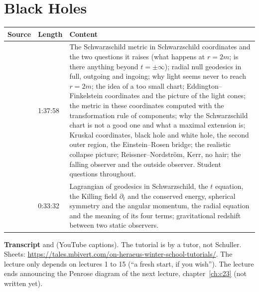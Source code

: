 \chapter{Black Holes}\label{ch:c22}
\begin{paracol}{2}

\begin{sources}
\begin{tabularx}{\linewidth}{@{}l l L@{}}
\toprule
\textbf{Source} & \textbf{Length} & \textbf{Content}\\
\midrule
{} & 1:37:58 & The Schwarzschild metric in Schwarzschild coordinates and the two questions it raises (what happens at $r=2m$; is there anything beyond $t=\pm\infty$); radial null geodesics in full, outgoing and ingoing; why light seems never to reach $r=2m$; the idea of a too small chart; Eddington--Finkelstein coordinates and the picture of the light cones; the metric in these coordinates computed with the transformation rule of components; why the Schwarzschild chart is not a good one and what a maximal extension is; Kruskal coordinates, black hole and white hole, the second outer region, the Einstein--Rosen bridge; the realistic collapse picture; Reissner--Nordstr\"om, Kerr, no hair; the falling observer and the outside observer. Student questions throughout.\\
 & 0:33:32 & Lagrangian of geodesics in Schwarzschild, the $t$ equation, the Killing field $\partial_t$ and the conserved energy, spherical symmetry and the angular momentum, the radial equation and the meaning of its four terms; gravitational redshift between two static observers.\\
\bottomrule
\end{tabularx}

\smallskip
\textbf{Transcript}  and  (YouTube captions). The tutorial is by a tutor, not Schuller. Sheets: \url{https://tales.mbivert.com/on-heraeus-winter-school-tutorials/}. The lecture only depends on lectures 1 to 15 (``a fresh start, if you wish''). The lecture ends announcing the Penrose diagram of the next lecture, chapter~\ref{ch:c23} (not written yet).
\end{sources}


\end{paracol}
